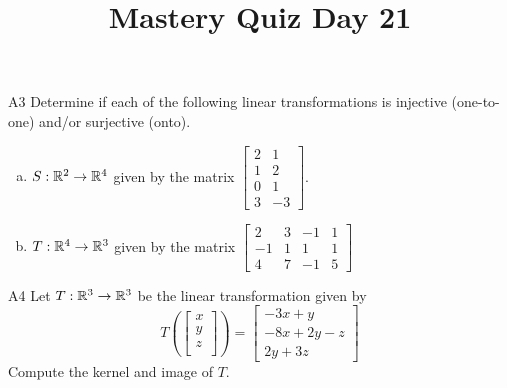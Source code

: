 \documentclass{sbgLAquiz}
\title{Mastery Quiz Day 21 }
\begin{document}
\begin{problem}{A3}
Determine if each of the following linear transformations is injective (one-to-one) and/or surjective (onto).
\begin{enumerate}[(a)]
\item $S: \mathbb{R}^2 \rightarrow \mathbb{R}^4$ given by the matrix $\begin{bmatrix} 2 & 1 \\ 1 & 2 \\ 0 & 1 \\ 3 & -3 \end{bmatrix}$.
\item $T: \mathbb{R}^4 \rightarrow \mathbb{R}^3$ given by the matrix $\begin{bmatrix} 2 & 3 & -1 & 1 \\ -1 & 1 & 1 & 1 \\ 4 & 7 & -1 & 5 \end{bmatrix}$
\end{enumerate}
\end{problem}

\begin{problem}{A4}
Let $T: \mathbb{R}^3\rightarrow \mathbb{R}^3$ be the linear transformation given by $$T\left(\begin{bmatrix} x \\ y \\ z \\  \end{bmatrix} \right) = \begin{bmatrix} -3x+y \\ -8x+2y-z \\ 2y+3z \end{bmatrix}$$
Compute the kernel and image of $T$.
\end{problem}
\end{document}
